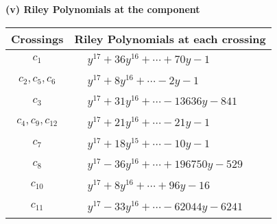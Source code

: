 \documentclass[1p]{elsarticle_modified}
\theoremstyle{definition}
\begin{document}
\newpage\renewcommand{\arraystretch}{1}
\flushleft \textbf{(v) Riley Polynomials at the component}\newline \\
\begin{tabular}{m{50pt}|m{274pt}}
Crossings & \hspace{64pt}Riley Polynomials at each crossing \\
\hline $$\begin{aligned}c_{1}\end{aligned}$$&$\begin{aligned}
&y^{17}+36 y^{16}+\cdots+70 y-1
\end{aligned}$\\
\hline $$\begin{aligned}c_{2},c_{5},c_{6}\end{aligned}$$&$\begin{aligned}
&y^{17}+8 y^{16}+\cdots-2 y-1
\end{aligned}$\\
\hline $$\begin{aligned}c_{3}\end{aligned}$$&$\begin{aligned}
&y^{17}+31 y^{16}+\cdots-13636 y-841
\end{aligned}$\\
\hline $$\begin{aligned}c_{4},c_{9},c_{12}\end{aligned}$$&$\begin{aligned}
&y^{17}+21 y^{16}+\cdots-21 y-1
\end{aligned}$\\
\hline $$\begin{aligned}c_{7}\end{aligned}$$&$\begin{aligned}
&y^{17}+18 y^{15}+\cdots-10 y-1
\end{aligned}$\\
\hline $$\begin{aligned}c_{8}\end{aligned}$$&$\begin{aligned}
&y^{17}-36 y^{16}+\cdots+196750 y-529
\end{aligned}$\\
\hline $$\begin{aligned}c_{10}\end{aligned}$$&$\begin{aligned}
&y^{17}+8 y^{16}+\cdots+96 y-16
\end{aligned}$\\
\hline $$\begin{aligned}c_{11}\end{aligned}$$&$\begin{aligned}
&y^{17}-33 y^{16}+\cdots-62044 y-6241
\end{aligned}$\\
\hline
\end{tabular}\\~\\
\end{document}
